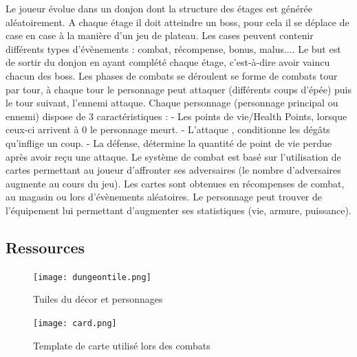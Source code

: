 \documentclass[a4paper,12pt]{article}
\begin{document}
Le joueur évolue dans un donjon dont la structure des étages est générée aléatoirement. A chaque étage il doit atteindre un boss, pour cela il se déplace de case en case à la manière d’un jeu de plateau. Les cases peuvent contenir différents types d'évènements : combat, récompense, bonus, malus.... Le but est de sortir du donjon en ayant complété chaque étage, c'est-à-dire avoir vaincu chacun des boss. 
Les phases de combats se déroulent se forme de combats tour par tour, à chaque tour le personnage peut attaquer (différents coups d'épée) puis le tour suivant, l'ennemi attaque. Chaque personnage (personnage principal ou ennemi) dispose de 3 caractéristiques :
- Les points de vie/Health Points, lorsque ceux-ci arrivent à 0 le personnage meurt. 
- L'attaque , conditionne les dégâts qu'inflige un coup.
- La défense, détermine la quantité de point de vie perdue après avoir reçu une attaque.
Le système de combat est basé sur l’utilisation de cartes permettant au joueur d’affronter ses adversaires (le nombre d’adversaires augmente au cours du jeu). Les cartes sont obtenues en récompenses de combat, au magasin ou lors d’évènements aléatoires. Le personnage peut trouver de l’équipement lui permettant d’augmenter ses statistiques (vie, armure, puissance).

\subsection{Ressources}

\begin{figure}[h]
\begin{center}
\texttt{[image: dungeontile.png]}
\caption{\label{tiles}Tuiles du décor et personnages}
\end{center}
\end{figure}

\begin{figure}[h]
\begin{center}
\texttt{[image: card.png]}
\caption{\label{card}Template de carte utilisé lors des combats}
\end{center}
\end{figure}
\end{document}
